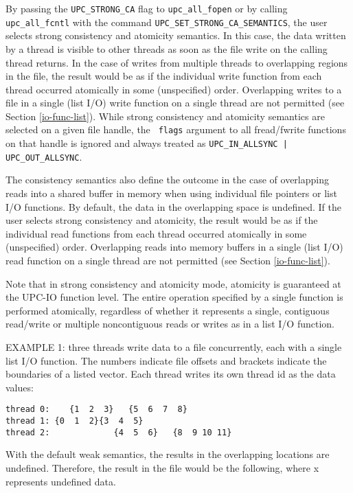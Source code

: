 \documentclass[12pt,titlepage]{article}
\newcounter{parnum}
\newcommand\np{\addtocounter{parnum}{1}\hspace{-2em}\makebox[2em][l]{\arabic{parnum}}}
\begin{document}
\np By passing the {\tt UPC\_STRONG\_CA} flag to {\tt upc\_all\_fopen} or 
by calling {\tt upc\_all\_fcntl} with the command 
{\tt UPC\_SET\_STRONG\_CA\_SEMANTICS}, the user selects strong
consistency and atomicity semantics. In this case, the data written by a
thread is visible to other threads as soon as the file write on the calling
thread returns. In the case of writes from multiple threads to overlapping
regions in the file, the result would be as if the individual write function
from each thread occurred atomically in some (unspecified) order.
Overlapping writes to a file in a single (list I/O) write function on a
single thread are not permitted (see Section \ref{io-func-list}). While strong consistency
and atomicity semantics are selected on a given file handle, the {\tt
flags} argument to all fread/fwrite functions on that handle is ignored
and always treated as {\tt UPC\_IN\_ALLSYNC | UPC\_OUT\_ALLSYNC}.

\np The consistency semantics also define the outcome in the case of overlapping
reads into a shared buffer in memory when using individual file pointers or
list I/O functions. By default, the data in the overlapping space is
undefined. If the user selects strong consistency and atomicity, the result would be as
if the individual read functions from each thread occurred atomically in
some (unspecified) order. Overlapping reads into memory buffers in a single
(list I/O) read function on a single thread are not permitted (see Section
\ref{io-func-list}).

\np Note that in strong consistency and atomicity mode, atomicity is guaranteed at the UPC-IO function
level. The entire operation specified by a single function is performed
atomically, regardless of whether it represents a single, contiguous
read/write or multiple noncontiguous reads or writes as in a list I/O
function.

\np EXAMPLE 1:  three threads write data to a file
concurrently, each with a single list I/O function. The numbers indicate
file offsets and brackets indicate the boundaries of a listed vector. Each
thread writes its own thread id as the data values:

\begin{verbatim}
thread 0:    {1  2  3}   {5  6  7  8}
thread 1: {0  1  2}{3  4  5}
thread 2:             {4  5  6}   {8  9 10 11}
\end{verbatim}

\np With the default weak semantics, the results in the overlapping locations
are undefined. Therefore, the result in the file would be the following,
where x represents undefined data.
\end{document}
